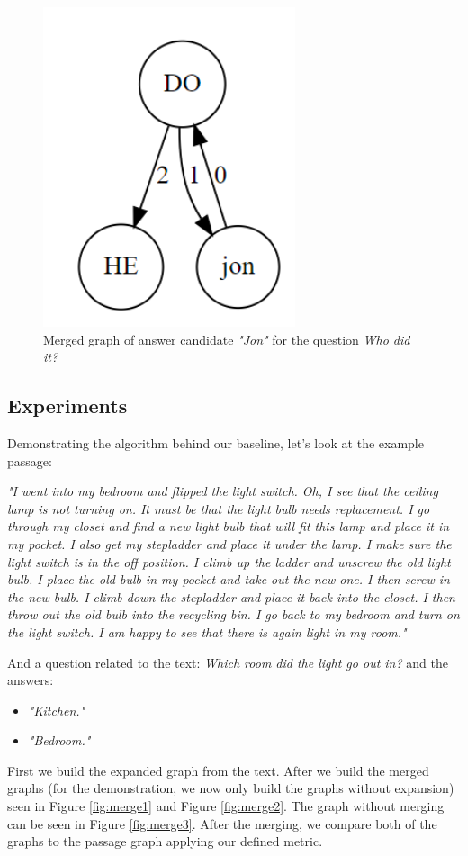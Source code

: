 \begin{figure}
	\centering
	\includegraphics[scale=0.4]{figures/merge}
	\caption{Merged graph of answer candidate \textit{"Jon"} for the
		question \textit{Who did it?}}
	\label{fig:merge}
\end{figure}

\subsection{Experiments}
\label{sec:exp}

Demonstrating the algorithm behind our baseline, let's look at the example passage:
\begin{center}
	\textit{ "I went into my bedroom and flipped the light switch. Oh, I see that the ceiling lamp is not turning on. It must be that the light bulb needs replacement. I go through my closet and find a new light bulb that will fit this lamp and place it in my pocket. I also get my stepladder and place it under the lamp. I make sure the light switch is in the off position. I climb up the ladder and unscrew the old light bulb. I place the old bulb in my pocket and take out the new one. I then screw in the new bulb. I climb down the stepladder and place it back into the closet. I then throw out the old bulb into the recycling bin. I go back to my bedroom and turn on the light switch. I am happy to see that there is again light in my room."}
\end{center}
And a question related to the text: \textit{Which room did the light go out in?} and the answers:
\begin{itemize}
	\item \textit{"Kitchen."}
	\item \textit{"Bedroom."}
\end{itemize}
First we build the expanded graph from the text. After we build the merged graphs (for the demonstration, we now only build the graphs without expansion) seen in Figure \ref{fig:merge1} and Figure \ref{fig:merge2}. The graph without merging can be seen in Figure \ref{fig:merge3}. After the merging, we compare both of the graphs to the passage graph applying our defined metric.

